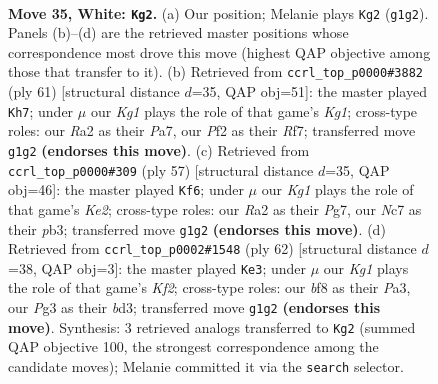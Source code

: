 \documentclass[11pt]{article}
\begin{document}
\clearpage

\begin{figure}[p]\centering
\begin{subfigure}{0.46\textwidth}\centering
\resizebox{\linewidth}{!}{%
\newchessgame
\chessboard[
  setfen={r4b2/ppN4k/5pp1/7p/P7/6P1/RPP2P1P/4r1K1 w - - 1 35},
  showmover=false,
  pgfstyle=straightmove, color=movearrow, markmove={g1-g2}
]}
\caption{}
\end{subfigure}\hfill
\begin{subfigure}{0.46\textwidth}\centering
\resizebox{\linewidth}{!}{%
\newchessgame
\chessboard[
  setfen={3R2k1/pp3rp1/7p/8/2n2p1B/2P4P/PP4P1/5K2 b - - 4 31},
  showmover=false,
  pgfstyle=straightmove, color=movearrow, markmove={g8-h7}
]}
\caption{}
\end{subfigure}
\\[4pt]
\begin{subfigure}{0.46\textwidth}\centering
\resizebox{\linewidth}{!}{%
\newchessgame
\chessboard[
  setfen={8/R3kpp1/4p2p/8/1p1r4/1P6/P3KPPP/8 b - - 1 29},
  showmover=false,
  pgfstyle=straightmove, color=movearrow, markmove={e7-f6}
]}
\caption{}
\end{subfigure}\hfill
\begin{subfigure}{0.46\textwidth}\centering
\resizebox{\linewidth}{!}{%
\newchessgame
\chessboard[
  setfen={3r1k2/pp3ppp/8/6P1/3N4/P2b1PR1/1P3K1P/8 w - - 2 32},
  showmover=false,
  pgfstyle=straightmove, color=movearrow, markmove={f2-e3}
]}
\caption{}
\end{subfigure}
\caption{\textbf{Move 35, White: \texttt{Kg2}.} (a) Our position; Melanie plays \texttt{Kg2} (\texttt{g1g2}). Panels (b)--(d) are the retrieved master positions whose correspondence most drove this move (highest QAP objective among those that transfer to it). (b) Retrieved from \texttt{ccrl\_top\_p0000\#3882} (ply 61) [structural distance $d$=35, QAP obj=51]: the master played \texttt{Kh7}; under $\mu$ our \emph{Kg1} plays the role of that game's \emph{Kg1}; cross-type roles: our \emph{R}a2 as their \emph{P}a7, our \emph{P}f2 as their \emph{R}f7; transferred move \texttt{g1g2} \textbf{(endorses this move)}. (c) Retrieved from \texttt{ccrl\_top\_p0000\#309} (ply 57) [structural distance $d$=35, QAP obj=46]: the master played \texttt{Kf6}; under $\mu$ our \emph{Kg1} plays the role of that game's \emph{Ke2}; cross-type roles: our \emph{R}a2 as their \emph{P}g7, our \emph{N}c7 as their \emph{p}b3; transferred move \texttt{g1g2} \textbf{(endorses this move)}. (d) Retrieved from \texttt{ccrl\_top\_p0002\#1548} (ply 62) [structural distance $d$=38, QAP obj=3]: the master played \texttt{Ke3}; under $\mu$ our \emph{Kg1} plays the role of that game's \emph{Kf2}; cross-type roles: our \emph{b}f8 as their \emph{P}a3, our \emph{P}g3 as their \emph{b}d3; transferred move \texttt{g1g2} \textbf{(endorses this move)}. Synthesis: 3 retrieved analogs transferred to \texttt{Kg2} (summed QAP objective 100, the strongest correspondence among the candidate moves); Melanie committed it via the \texttt{search} selector.}
\label{fig:thought-m68}
\end{figure}
\end{document}
